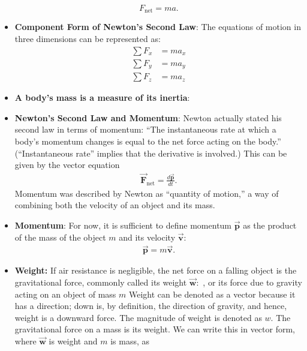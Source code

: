 \documentclass{report}
\begin{document}
\begin{itemize}
                \[
                    F_{\text{net}} = ma.
                \]
            \item \textbf{Component Form of Newton’s Second Law}:
                The equations of motion in three dimensions can be represented as:
                \begin{align}
                    \sum F_x &= m a_x \\
                    \sum F_y &= m a_y \\
                    \sum F_z &= m a_z
                \end{align}
            \item \textbf{A body’s mass is a measure of its inertia}:
            \item \textbf{Newton’s Second Law and Momentum}: Newton actually stated his second law in terms of momentum: “The instantaneous rate at which a body’s momentum changes is equal to the net force acting on the body.” (“Instantaneous rate” implies that the derivative is involved.) This can be given by the vector equation
                \begin{align*}
                    \vec{\mathbf{F}}_{\text{net}} = \frac{d\vec{\mathbf{p}}}{dt}
                .\end{align*}
                Momentum was described by Newton as “quantity of motion,” a way of combining both the velocity of an object and its mass.
            \item \textbf{Momentum}: For now, it is sufficient to define momentum $\vec{\mathbf{p}}$ as the product of the mass of the object $m$ and its velocity $\vec{\mathbf{v}}:$
                \begin{align*}
                    \vec{\mathbf{p}} = m\vec{\mathbf{v}}
                .\end{align*}
            \item \textbf{Weight:} If air resistance is negligible, the net force on a falling object is the gravitational force, commonly called its weight  $\vec{\mathbf{w}}:$ , or its force due to gravity acting on an object of mass $m$
                \bigbreak \noindent 
                Weight can be denoted as a vector because it has a direction; down is, by definition, the direction of gravity, and hence, weight is a downward force. The magnitude of weight is denoted as $w$.
                \bigbreak \noindent 
                The gravitational force on a mass is its weight. We can write this in vector form, where $\vec{\mathbf{w}}$ is weight and $m$ is mass, as
                \begin{align*}

\end{align*}
\end{itemize}
\end{document}
